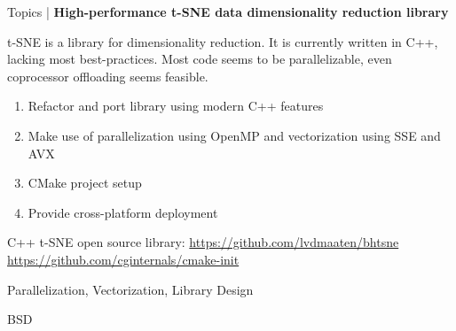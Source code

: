 \begin{frame}{Topics | \textbf{High-performance t-SNE data dimensionality reduction library}}
	
	\begin{description}[C++ Competencies]
		\item[Description] t-SNE is a library for dimensionality reduction. It is currently written in C++, lacking most best-practices. Most code seems to be parallelizable, even coprocessor offloading seems feasible.
		\item[Goals]
		\begin{enumerate}
			\item Refactor and port library using modern C++ features
			\item Make use of parallelization using OpenMP and vectorization using SSE and AVX
			\item CMake project setup
			\item Provide cross-platform deployment
		\end{enumerate}
		\item[Starting Points] C++ t-SNE open source library: \url{https://github.com/lvdmaaten/bhtsne}\\\url{https://github.com/cginternals/cmake-init}
		\item[C++ Competencies] Parallelization, Vectorization, Library Design
		\item[License] BSD
	\end{description}
	
\end{frame}


